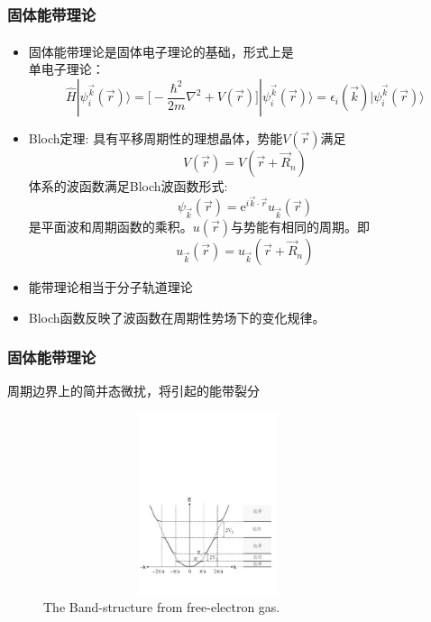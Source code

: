 \documentclass[cjk,slidestop,compress,mathserif,blue]{beamer}
\newcommand{\upcite}[1]{\hspace{0ex}\textsuperscript{\cite{#1}}} %
\begin{document}
\frame
{
\frametitle{固体能带理论}
\begin{itemize}%
   \setlength{\itemsep}{8pt}
   \item 固体能带理论\upcite{Huang-Han}是固体电子理论的基础，形式上是\\单电子理论：
    $$\hat H |\psi_i^{\vec k}(\vec r)\rangle=\bigg[-\dfrac{\hbar^2}{2m}\nabla^2+V(\vec r)\bigg]|\psi_i^{\vec k}(\vec r)\rangle=\epsilon_i(\vec k)|\psi_i^{\vec k}(\vec r)\rangle$$
  \item \textrm{Bloch}定理:
具有平移周期性的理想晶体，势能$V(\vec r)$满足$$V(\vec r)=V(\vec r+\vec R_n)$$
体系的波函数满足\textrm{Bloch}波函数形式:$$\psi_{\vec k}(\vec r)=\textrm{e}^{i\vec k\cdot\vec r}u_{\vec k}(\vec r)$$
是平面波和周期函数的乘积。$u(\vec r)$与势能有相同的周期。即$$u_{\vec k}(\vec r)=u_{\vec k}(\vec r+\vec R_n)$$
  \item 能带理论相当于分子轨道理论
\item \textrm{Bloch}函数反映了波函数在周期性势场下的变化规律。
\end{itemize}
}

\frame
{
\frametitle{固体能带理论}
周期边界上的简并态微扰，将引起的能带裂分
\begin{figure}[h!]
\centering
\includegraphics[height=2.1in,width=3.8in,viewport=10 90 570 380,clip]{Figures/Band_Gap.pdf}
\caption{\small \textrm{The Band-structure from free-electron gas.}}%
\label{Band-Structure-1}
\end{figure} 
}
\end{document}
